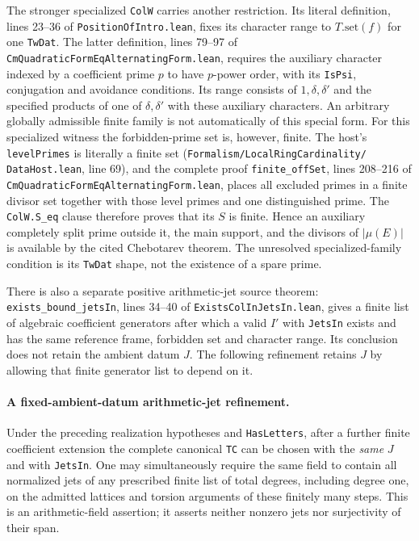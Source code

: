 The stronger specialized \texttt{ColW} carries another
restriction.  Its literal definition, lines 23--36 of
\texttt{PositionOfIntro.lean}, fixes its character range
to $T.\mathrm{set}(f)$ for one \texttt{TwDat}.
The latter definition, lines 79--97 of
\texttt{CmQuadraticFormEqAlternatingForm.lean}, requires
the auxiliary character indexed by a coefficient prime
$p$ to have $p$-power order, with its \texttt{IsPsi},
conjugation and avoidance conditions.  Its range consists
of $1,\delta,\delta'$ and the specified products of
one of $\delta,\delta'$ with these auxiliary characters.
An arbitrary globally admissible finite family is not
automatically of this special form.
For this specialized witness the forbidden-prime set is,
however, finite.  The host's \texttt{levelPrimes} is
literally a finite set (\texttt{Formalism/LocalRingCardinality/}
\texttt{DataHost.lean}, line 69), and the complete proof
\texttt{finite\_offSet}, lines 208--216 of
\texttt{CmQuadraticFormEqAlternatingForm.lean}, places
all excluded primes in a finite divisor set together
with those level primes and one distinguished prime.
The \texttt{ColW.S\_eq} clause therefore proves that
its $S$ is finite.  Hence an auxiliary completely split
prime outside it, the main support, and the divisors of
$|\mu(E)|$ is available by the cited Chebotarev theorem.
The unresolved specialized-family condition is its
\texttt{TwDat} shape, not the existence of a spare prime.

There is also a separate positive arithmetic-jet source
theorem: \texttt{exists\_bound\_jetsIn}, lines 34--40
of \texttt{ExistsColInJetsIn.lean}, gives a finite list
of algebraic coefficient generators after which a valid
$I'$ with \texttt{JetsIn} exists and has the same
reference frame, forbidden set and character range.
Its conclusion does not retain the ambient datum $J$.
The following refinement retains $J$ by allowing that
finite generator list to depend on it.

\paragraph{A fixed-ambient-datum arithmetic-jet refinement.}
Under the preceding realization hypotheses and
\texttt{HasLetters}, after a further finite coefficient
extension the complete canonical \texttt{TC} can be
chosen with the \emph{same} $J$ and with
\texttt{JetsIn}.  One may simultaneously require the
same field to contain all normalized jets of any
prescribed finite list of total degrees, including
degree one, on the admitted lattices and torsion
arguments of these finitely many steps.  This is
an arithmetic-field assertion; it asserts neither
nonzero jets nor surjectivity of their span.

